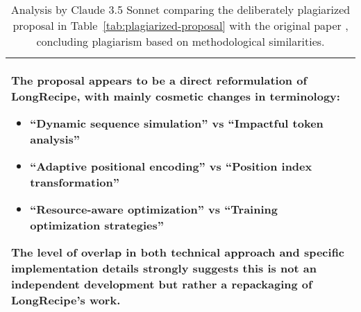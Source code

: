 \begin{table*}[t]
\begin{tabular}{|p{}|}
        \textbf{The proposal appears to be a direct reformulation of LongRecipe, with mainly cosmetic changes in terminology:}
        \begin{itemize}
        \item ``Dynamic sequence simulation'' vs ``Impactful token analysis''
        \item ``Adaptive positional encoding'' vs ``Position index transformation''
        \item ``Resource-aware optimization'' vs ``Training optimization strategies''
        \end{itemize}

        The level of overlap in both technical approach and specific implementation details strongly suggests this is not an independent development but rather a repackaging of LongRecipe's work. \\
        \hline
    \end{tabular}
    \caption{Analysis by Claude 3.5 Sonnet comparing the deliberately plagiarized proposal in Table~\ref{tab:plagiarized-proposal} with the original paper \citep{hu2024longrecipe}, concluding plagiarism based on methodological similarities.}
    \label{tab:llm-analysis}
\end{table*}
